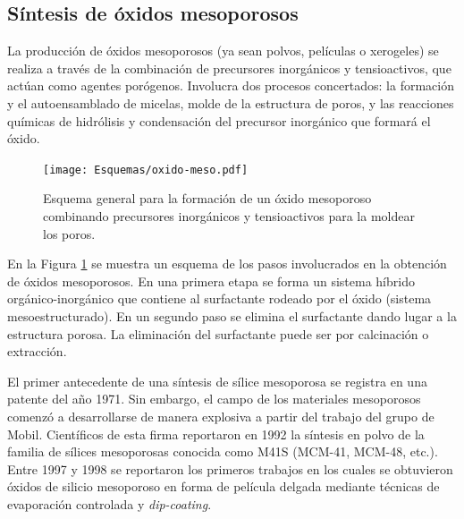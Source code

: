 	\subsection{Síntesis de óxidos mesoporosos} 

	 La producción de óxidos mesoporosos (ya sean polvos, películas o xerogeles) se realiza a través de la combinación de precursores inorgánicos y tensioactivos, que actúan como agentes porógenos. Involucra dos procesos concertados: la formación y el autoensamblado de micelas, molde de la estructura de poros, y las reacciones químicas de hidrólisis y condensación del precursor inorgánico que formará el óxido. 

				\begin{figure}[h!]
 				\begin{center}
 				\texttt{[image: Esquemas/oxido-meso.pdf]}
 				\caption[Esquema general para la formación de un óxido mesoestructurado]{Esquema general para la formación de un óxido mesoporoso combinando precursores inorgánicos y tensioactivos para la moldear los poros.}
 		   		\label{fig:oxmeso}
 		    	\end{center}
 		    	\end{figure}

	 En la Figura \ref{fig:oxmeso} se muestra un esquema de los pasos involucrados en la obtención de óxidos mesoporosos. En una primera etapa se forma un sistema híbrido orgánico-inorgánico que contiene al surfactante rodeado por el óxido (sistema mesoestructurado). En un segundo paso se elimina el surfactante dando lugar a la estructura porosa. La eliminación del surfactante puede ser por calcinación o extracción.
 

     El primer antecedente de una síntesis de sílice mesoporosa se registra en una patente del año 1971. Sin embargo, el campo de los materiales mesoporosos comenzó a desarrollarse de manera explosiva a partir del trabajo del grupo de Mobil. Científicos de esta firma reportaron en 1992 la síntesis en polvo de la familia de sílices mesoporosas conocida como M41S (MCM-41, MCM-48, etc.).\cite{Kresge1992,Beck1992} Entre 1997 y 1998 se reportaron los primeros trabajos en los cuales se obtuvieron óxidos de silicio mesoporoso en forma de película delgada mediante técnicas de evaporación controlada y \textit{dip-coating}.\cite{Lu1997,Zhao1998a,Zhao1998,Brinker1999} 

